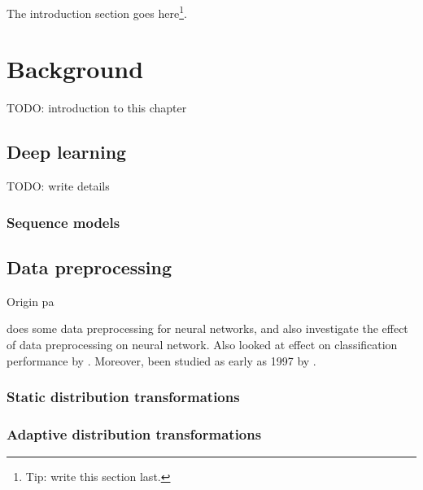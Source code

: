 \documentclass{statsmsc}
\begin{document}
The introduction section goes here\footnote{Tip: write this section last.}.


\chapter{Background} %

TODO: introduction to this chapter

\section{Deep learning}%
\label{sec:Deep learning}

TODO: write details

\subsection{Sequence models}%
\label{sub:Sequence models}



\section{Data preprocessing}%
\label{sec:Data preprocessing}

Origin pa

\cite{stanislav} does some data preprocessing for neural networks, and
\cite{nawi} also investigate the effect of data preprocessing on neural network.
Also looked at effect on classification performance by \cite{singh}.
Moreover, been studied as early as 1997 by \citep{preprocess_origin}.

\subsection{Static distribution transformations}%
\label{sub:Static distribution transformations}



\subsection{Adaptive distribution transformations}%
\label{sub:Adaptive distribution transformations}
\end{document}
